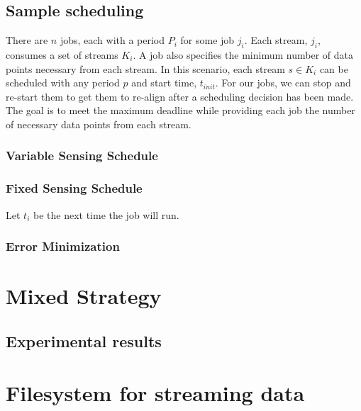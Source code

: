 \documentclass[10pt,print,letterpaper]{sigplan-proc-varsize}
\begin{document}
\subsection{Sample scheduling}
There are $n$ jobs, each with a period $P_{i}$ for some job $j_{i}$.  Each stream, $j_{i}$, consumes a set
of streams $K_{i}$.  A job also specifies the minimum number of data points necessary from each stream.
In this scenario, each stream $s \in K_{i}$ can be scheduled with any period $p$
and start time, $t_{init}$.  For our jobs, we can stop and re-start them to get them to re-align after
a scheduling decision has been made.  The goal is to meet the maximum deadline while providing each job
the number of necessary data points from each stream.


\subsubsection{Variable Sensing Schedule}

\subsubsection{Fixed Sensing Schedule}
Let $t_{i}$ be the  next time the job will run.


\subsubsection{Error Minimization}

\section{Mixed Strategy}









\subsection{Experimental results}


\section{Filesystem for streaming data}
\end{document}
